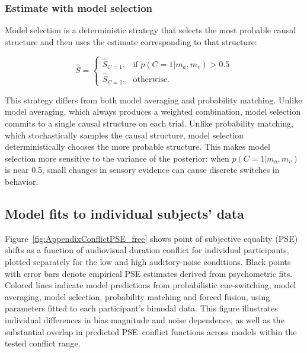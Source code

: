 \documentclass[9pt,lineno,doublespacing]{elife}
\begin{document}
\subsubsection{Estimate with model selection}

Model selection is a deterministic strategy that selects the most probable causal structure and then uses the estimate corresponding to that structure:

\begin{equation}
\label{eq:estimate_selection}
\hat{S} = \begin{cases}
\hat{S}_{C=1}, & \text{if } p(C=1 | m_a, m_v) > 0.5 \\
\hat{S}_{C=2}, & \text{otherwise.}
\end{cases}
\end{equation}

This strategy differs from both model averaging and probability matching. Unlike model averaging, which always produces a weighted combination, model selection commits to a single causal structure on each trial. Unlike probability matching, which stochastically samples the causal structure, model selection deterministically chooses the more probable structure. This makes model selection more sensitive to the variance of the posterior: when $p(C=1 | m_a, m_v)$ is near 0.5, small changes in sensory evidence can cause discrete switches in behavior.



\subsection{Model fits to individual subjects' data}

Figure~\ref{fig:AppendixConflictPSE_free} shows point of subjective equality (PSE) shifts as a function of audiovisual duration conflict for individual participants, plotted separately for the low and high auditory-noise conditions. Black points with error bars denote empirical PSE estimates derived from psychometric fits. Colored lines indicate model predictions from probabilistic cue-switching, model averaging, model selection, probability matching and forced fusion, using parameters fitted to each participant’s bimodal data. This figure illustrates individual differences in bias magnitude and noise dependence, as well as the substantial overlap in predicted PSE–conflict functions across models within the tested conflict range.


\end{document}
